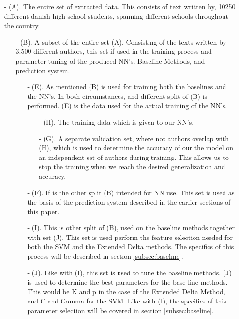 \begin{itemize}

\item[- (A).] The entire set of extracted data. This consists of text written
by, 10250 different danish high school students, spanning different schools
throughout the country.

\begin{itemize}

\item[- (B).]
A subset of the entire set (A). Consisting of the texts written by
3.500 different authors, this set if used in the training process and parameter
tuning of the produced \gls{NN}'s, Baseline Methods, and prediction system.

\begin{itemize}

\item[- (E).] As mentioned (B) is used for training both the baselines and the 
\gls{NN}'s. In both circumstances, and different split of (B) is performed.
(E) is the data used for the actual training of the \gls{NN}'s.


\begin{itemize}
\item[- (H).] The training data which is given to our \gls{NN}'s.

\item[- (G).] A separate validation set, where not authors overlap with (H), which
is used to determine the accuracy of our the model on an independent set of
authors during training. This allows us to stop the training when we reach
the desired generalization and accuracy.

\end{itemize}


\item[- (F).] If is the other split (B) intended for \gls{NN} use. This set is
used as the basis of the prediction system described in the earlier 
sections of this paper.

\item[- (I).] This is other split of (B), used on the baseline methods together
with set (J). This set is used perform the feature selection needed for both
the SVM and the Extended Delta methods. The specifics of this process will be
described in section \ref{subsec:baseline}.

\item[- (J).] Like with (I), this set is used to tune the baseline methods. (J) is
used to determine the best parameters for the base line methods. This would be K
and p in the case of the Extended Delta Method, and C and Gamma for the SVM.
Like with (I), the specifics of this parameter selection will be covered in
section \ref{subsec:baseline}.


\end{itemize}
\end{itemize}
\end{itemize}
